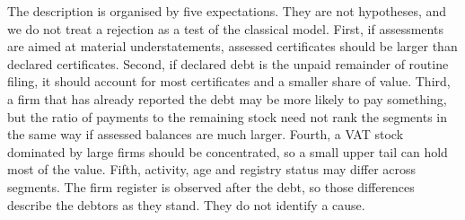 The description is organised by five expectations.
They are not hypotheses, and we do not treat a rejection as a test of the classical model.
First, if assessments are aimed at material understatements, assessed certificates should be larger than declared certificates.
Second, if declared debt is the unpaid remainder of routine filing, it should account for most certificates and a smaller share of value.
Third, a firm that has already reported the debt may be more likely to pay something, but the ratio of payments to the remaining stock need not rank the segments in the same way if assessed balances are much larger.
Fourth, a VAT stock dominated by large firms should be concentrated, so a small upper tail can hold most of the value.
Fifth, activity, age and registry status may differ across segments.
The firm register is observed after the debt, so those differences describe the debtors as they stand.
They do not identify a cause.
